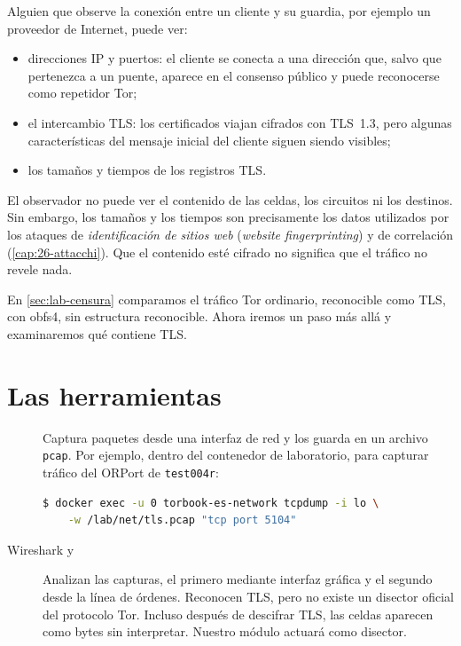 Alguien que observe la conexión entre un cliente y su guardia, por ejemplo un proveedor de Internet, puede ver:
\begin{itemize}
  \item direcciones IP y puertos: el cliente se conecta a una dirección que, salvo que pertenezca a un puente, aparece en el consenso público y puede reconocerse como repetidor Tor;
  \item el intercambio TLS: los certificados viajan cifrados con TLS~1.3, pero algunas características del mensaje inicial del cliente siguen siendo visibles;
  \item los tamaños y tiempos de los registros TLS.
\end{itemize}

El observador no puede ver el contenido de las celdas, los circuitos ni los destinos. Sin embargo, los tamaños y los tiempos son precisamente los datos utilizados por los ataques de \emph{identificación de sitios web} (\emph{website fingerprinting}) y de correlación (\cref{cap:26-attacchi}). Que el contenido esté cifrado no significa que el tráfico no revele nada.

En \cref{sec:lab-censura} comparamos el tráfico Tor ordinario, reconocible como TLS, con obfs4, sin estructura reconocible. Ahora iremos un paso más allá y examinaremos qué contiene TLS.

\section{Las herramientas}\label{sec:traffico-strumenti}

\begin{description}
  \item[] Captura paquetes desde una interfaz de red y los guarda en un archivo \texttt{pcap}. Por ejemplo, dentro del contenedor de laboratorio, para capturar tráfico del ORPort de \texttt{test004r}:
\begin{lstlisting}[language=bash,numbers=none]
$ docker exec -u 0 torbook-es-network tcpdump -i lo \
    -w /lab/net/tls.pcap "tcp port 5104"
\end{lstlisting}
  \item[Wireshark y ] Analizan las capturas, el primero mediante interfaz gráfica y el segundo desde la línea de órdenes. Reconocen TLS, pero no existe un disector oficial del protocolo Tor. Incluso después de descifrar TLS, las celdas aparecen como bytes sin interpretar. Nuestro módulo  actuará como disector.
\end{description}

